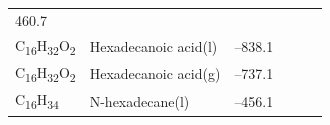 \documentclass[
  9pt,
]{extbook}
\theoremstyle{definition}
\theoremstyle{definition}
\theoremstyle{definition}
\theoremstyle{remark}
\begin{document}
\begin{longtable}[]{@{}llllll@{}}
\begin{minipage}[t]{0.14\columnwidth}
460.7\strut
\end{minipage}\tabularnewline
\begin{minipage}[t]{0.07\columnwidth}\raggedright
C\textsubscript{16}H\textsubscript{32}O\textsubscript{2}\strut
\end{minipage} & \begin{minipage}[t]{0.17\columnwidth}\raggedright
Hexadecanoic acid(l)\strut
\end{minipage} & \begin{minipage}[t]{0.15\columnwidth}\raggedright
--838.1\strut
\end{minipage} & \begin{minipage}[t]{0.15\columnwidth}\raggedright
\strut
\end{minipage} & \begin{minipage}[t]{0.14\columnwidth}\raggedright
\strut
\end{minipage} & \begin{minipage}[t]{0.14\columnwidth}\raggedright
\strut
\end{minipage}\tabularnewline
\begin{minipage}[t]{0.07\columnwidth}\raggedright
C\textsubscript{16}H\textsubscript{32}O\textsubscript{2}\strut
\end{minipage} & \begin{minipage}[t]{0.17\columnwidth}\raggedright
Hexadecanoic acid(g)\strut
\end{minipage} & \begin{minipage}[t]{0.15\columnwidth}\raggedright
--737.1\strut
\end{minipage} & \begin{minipage}[t]{0.15\columnwidth}\raggedright
\strut
\end{minipage} & \begin{minipage}[t]{0.14\columnwidth}\raggedright
\strut
\end{minipage} & \begin{minipage}[t]{0.14\columnwidth}\raggedright
\strut
\end{minipage}\tabularnewline
\begin{minipage}[t]{0.07\columnwidth}\raggedright
C\textsubscript{16}H\textsubscript{34}\strut
\end{minipage} & \begin{minipage}[t]{0.17\columnwidth}\raggedright
N-hexadecane(l)\strut
\end{minipage} & \begin{minipage}[t]{0.15\columnwidth}\raggedright
--456.1\strut
\end{minipage} & \begin{minipage}[t]{0.15\columnwidth}\raggedright

\end{minipage}
\end{longtable}
\end{document}

